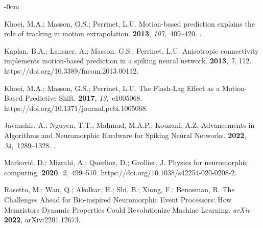 \documentclass[brainsci, %
               review,accept,pdftex,moreauthors
               ]{Definitions/mdpi}
\begin{document}
\begin{adjustwidth}{-\extralength}{0cm}
\begin{thebibliography}{999}
Khoei, M.A.; Masson, G.S.; Perrinet, L.U.
\newblock Motion-based prediction explains the role of tracking in motion
  extrapolation.
 {\bf 2013}, {\em 107},~409--420.
.

Kaplan, B.A.; Lansner, A.; Masson, G.S.; Perrinet, L.U.
\newblock Anisotropic connectivity implements motion-based prediction in a
  spiking neural network.
 {\bf 2013}, {\em 7}, 112.
  {{https://doi.org/10.3389/fncom.2013.00112}}.

Khoei, M.A.; Masson, G.S.; Perrinet, L.U.
\newblock The {Flash}-{Lag} {Effect} as a {Motion}-{Based} {Predictive}
  {Shift}.
 {\bf 2017}, {\em 13},~e1005068.
  {{https://doi.org/10.1371/journal.pcbi.1005068}}.

Javanshir, A.; Nguyen, T.T.; Mahmud, M.A.P.; Kouzani, A.Z.
\newblock Advancements in {Algorithms} and {Neuromorphic} {Hardware} for
  {Spiking} {Neural} {Networks}.
 {\bf 2022}, {\em 34},~1289--1328.
.

Marković, D.; Mizrahi, A.; Querlioz, D.; Grollier, J.
\newblock Physics for neuromorphic computing.
 {\bf 2020}, {\em 2},~499--510.
  {{https://doi.org/10.1038/s42254-020-0208-2}}.

Rasetto, M.; Wan, Q.; Akolkar, H.; Shi, B.; Xiong, F.; Benosman, R.
\newblock The {Challenges} {Ahead} for {Bio}-inspired {Neuromorphic} {Event}
  {Processors}: {How} {Memristors} {Dynamic} {Properties} {Could}
  {Revolutionize} {Machine} {Learning}. \emph{arXiv}  \textbf{2022},  	arXiv:2201.12673.


\end{thebibliography}
\end{adjustwidth}
\end{document}
